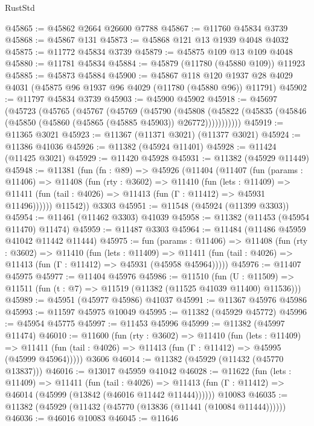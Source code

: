 \begin{lexlean}{RustStd}
\begin{coremodule}
@45865 := @45862 @2664 @26600 @7788
@45867 := @11760 @45834 @3739
@45868 := @45867 @131
@45873 := @45868 @121 @13 @1939 @4048 @4032
@45875 := @11772 @45834 @3739
@45879 := @45875 @109 @13 @109 @4048
@45880 := @11781 @45834
@45884 := @45879 (@11780 (@45880 @109)) @11923
@45885 := @45873 @45884
@45900 := @45867
    @118
    @120
    @1937
    @28
    @4029
    @4031
    (@45875 @96 @1937 @96 @4029 (@11780 (@45880 @96)) @11791)
@45902 := @11797 @45834 @3739
@45903 := @45900 @45902
@45918 := @45697
    (@45723
      (@45765
        (@45767
          (@45769
            (@45790
              (@45808
                (@45822 (@45835 (@45846 (@45850 (@45860 (@45865 (@45885 @45903)) @26772)))))))))))
@45919 := @11365 @3021
@45923 := @11367 (@11371 @3021) (@11377 @3021)
@45924 := @11386 @41036
@45926 := @11382 (@45924 @11401)
@45928 := @11424 (@11425 @3021)
@45929 := @11420 @45928
@45931 := @11382 (@45929 @11449)
@45948 := @11381
    (fun (fn : @89) =>
    @45926
      (@11404
        (@11407
          (fun (params : @11406) =>
          @11408
            (fun (rty : @3602) =>
            @11410
              (fun (lets : @11409) =>
              @11411 (fun (tail : @4026) => @11413 (fun (Γ : @11412) => @45931 @11496))))))
        @11542))
    @3303
@45951 := @11548 (@45924 (@11399 @3303))
@45954 := @11461 (@11462 @3303) @41039
@45958 := @11382 (@11453 (@45954 @11470) @11474)
@45959 := @11487 @3303
@45964 := @11484 (@11486 @45959 @41042 @11442 @11444)
@45975 := fun (params : @11406) =>
  @11408
    (fun (rty : @3602) =>
    @11410
      (fun (lets : @11409) =>
      @11411 (fun (tail : @4026) => @11413 (fun (Γ : @11412) => @45931 (@45958 @45964)))))
@45976 := @11407 @45975
@45977 := @11404 @45976
@45986 := @11510
    (fun (U : @11509) => @11511 (fun (t : @7) => @11519 (@11382 (@11525 @41039 @11400) @11536)))
@45989 := @45951 (@45977 @45986) @41037
@45991 := @11367 @45976 @45986
@45993 := @11597 @45975 @10049
@45995 := @11382 (@45929 @45772)
@45996 := @45954 @45775
@45997 := @11453 @45996
@45999 := @11382 (@45997 @11474)
@46010 := @11600
    (fun (rty : @3602) =>
    @11410
      (fun (lets : @11409) =>
      @11411 (fun (tail : @4026) => @11413 (fun (Γ : @11412) => @45995 (@45999 @45964)))))
    @3606
@46014 := @11382 (@45929 (@11432 (@45770 @13837)))
@46016 := @13017 @45959 @41042
@46028 := @11622
    (fun (lets : @11409) =>
    @11411
      (fun (tail : @4026) =>
      @11413 (fun (Γ : @11412) => @46014 (@45999 (@13842 (@46016 @11442 @11444))))))
    @10083
@46035 := @11382 (@45929 (@11432 (@45770 (@13836 (@11441 (@10084 @11444))))))
@46036 := @46016 @10083
@46045 := @11646

\end{coremodule}
\end{lexlean}
